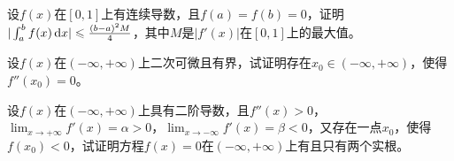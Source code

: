 \begin{example}
	设$f(x)$在$[0,1]$上有连续导数，且$f(a)=f(b)=0$，证明$|\int_{a}^{b}f(x)\,\mathrm{d} x|\leqslant\frac{(b-a)^2M}{4}$，其中$M$是$|f'(x)|$在$[0,1]$上的最大值。
\end{example}

\begin{example}
	设$f(x)$在$(-\infty,+\infty)$上二次可微且有界，试证明存在$x_0\in(-\infty,+\infty)$，使得$f''(x_0)=0$。
\end{example}

\begin{example}
	设$f(x)$在$(-\infty,+\infty)$上具有二阶导数，且$f''(x)>0$，$\lim_{x\to+\infty}f'(x)=\alpha>0$，$\lim_{x\to-\infty}f'(x)=\beta<0$，又存在一点$x_0$，使得$f(x_0)<0$，试证明方程$f(x)=0$在$(-\infty,+\infty)$上有且只有两个实根。
\end{example}
